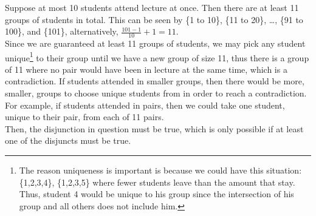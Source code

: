 \documentclass[]{article}
\begin{document}
Suppose at most 10 students attend lecture at once. Then there are at least 11 groups of students in total. This can be seen by \{1 to 10\}, \{11 to 20\}, \ldots, \{91 to 100\}, and \{101\}, alternatively, $\frac{101-1}{10} + 1 = 11$. \\

Since we are guaranteed at least 11 groups of students, we may pick any student unique\footnote{The reason uniqueness is important is because we could have this situation: \{1,2,3,4\}, \{1,2,3,5\} where fewer students leave than the amount that stay. Thus, student 4 would be unique to his group since the intersection of his group and all others does not include him.} to their group until we have a new group of size 11, thus there is a group of 11 where no pair would have been in lecture at the same time, which is a contradiction. If students attended in smaller groups, then there would be more, smaller, groups to choose unique students from in order to reach a contradiction. For example, if students attended in pairs, then we could take one student, unique to their pair, from each of 11 pairs.\\

Then, the disjunction in question must be true, which is only possible if at least one of the disjuncts must be true.
\end{document}
